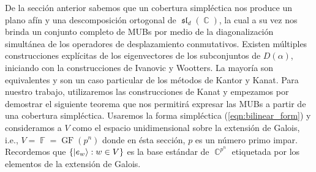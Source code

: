 \documentclass[a4paper]{report}
\DeclareMathOperator{\C}{\mathbb{C}}
\DeclareMathOperator{\F}{\mathbb{F}}
\DeclareMathOperator{\GF}{GF}
\DeclareMathOperator{\Sl}{\mathfrak{sl}}
\begin{document}
  De la sección anterior sabemos que un cobertura
  simpléctica nos produce un plano afín y una descomposición
  ortogonal de $\Sl_d(\C)$, la cual a su vez nos brinda un
  conjunto completo de MUBs por medio de la diagonalización
  simultánea de los operadores de desplazamiento
  conmutativos. Existen múltiples construcciones explícitas
  de los eigenvectores de los subconjuntos de $D(\alpha)$,
  iniciando con la construcciones de Ivanovic y Wootters. La
  mayoría son equivalentes y son un caso particular de los
  métodos de Kantor y Kanat. Para nuestro trabajo,
  utilizaremos las construcciones de Kanat y empezamos por
  demostrar el siguiente teorema que nos permitirá expresar
  las MUBs a partir de una cobertura simpléctica. Usaremos
  la forma simpléctica (\ref{eqn:bilinear_form}) y
  consideramos a $V$ como el espacio unidimensional sobre la
  extensión de Galois, i.e., $V = \F = \GF(p^{n})$ donde en
  ésta sección, $p$ es un número primo impar.  Recordemos
  que $\{\ket{e_w} : w \in V\}$ es la base estándar de
  $\C^{p^{n}}$ etiquetada por los elementos de la extensión
  de Galois.
\end{document}

